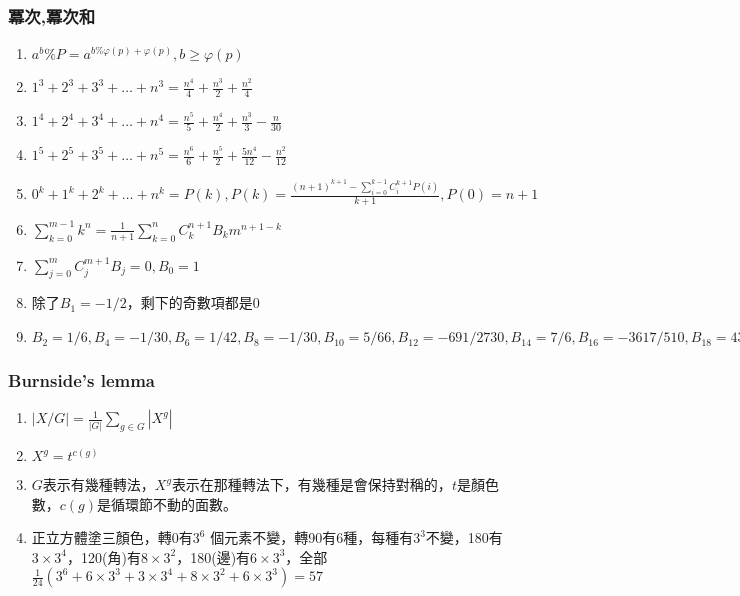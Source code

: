 \subsubsection{冪次,冪次和}
\begin{enumerate}\itemsep = -5pt
	\item $a^b\%P=a^{b\% \varphi (p)+\varphi (p)},b\geq \varphi (p)$
	\item $1^3+2^3+3^3+\ldots +n^3=\frac{n^4}{4}+\frac{n^3}{2}+\frac{n^2}{4}$
	\item $1^4+2^4+3^4+\ldots +n^4=\frac{n^5}{5}+\frac{n^4}{2}+\frac{n^3}{3}-\frac{n}{30}$
	\item $1^5+2^5+3^5+\ldots +n^5=\frac{n^6}{6}+\frac{n^5}{2}+\frac{5n^4}{12}-\frac{n^2}{12}$
	\item $0^k+1^k+2^k+\ldots +n^k = P(k),P(k)=\frac{(n+1)^{k+1}-\sum_{i=0}^{k-1}C_i^{k+1}P(i)}{k+1},P(0)=n+1$
	\item $\sum_{k=0}^{m-1}k^n=\frac{1}{n+1}\sum_{k=0}^{n}C_k^{n+1}B_km^{n+1-k}$
	\item $\sum_{j=0}^{m}C_j^{m+1}B_j=0,B_0=1$
	\item 除了$B_1=-1/2$，剩下的奇數項都是$0$
	\item $B_2=1/6,B_4=-1/30,B_6=1/42,B_8=-1/30,B_{10}=5/66,B_{12}=-691/2730,B_{14}=7/6,B_{16}=-3617/510,B_{18}=43867/798,B_{20}=-174611/330,$
\end{enumerate}

\subsubsection{Burnside's lemma}
\begin{enumerate}\itemsep = -5pt
	\item $|X/G| = \frac{1}{|G|}\sum_{g \in G}|X^g|$
	\item $X^g=t^{c(g)}$
	\item $G$表示有幾種轉法，$X^g$表示在那種轉法下，有幾種是會保持對稱的，$t$是顏色數，$c(g)$是循環節不動的面數。
	\item 正立方體塗三顏色，轉0有$3^6$ 個元素不變，轉90有6種，每種有$3^3$不變，180有$3\times 3^4$，120(角)有$8\times 3^2$，180(邊)有$6\times 3^3$，全部$\frac{1}{24}\left(3^6+6\times 3^3 + 3 \times 3^4 + 8 \times 3^2 + 6 \times 3^3 \right) = 57$
\end{enumerate}

